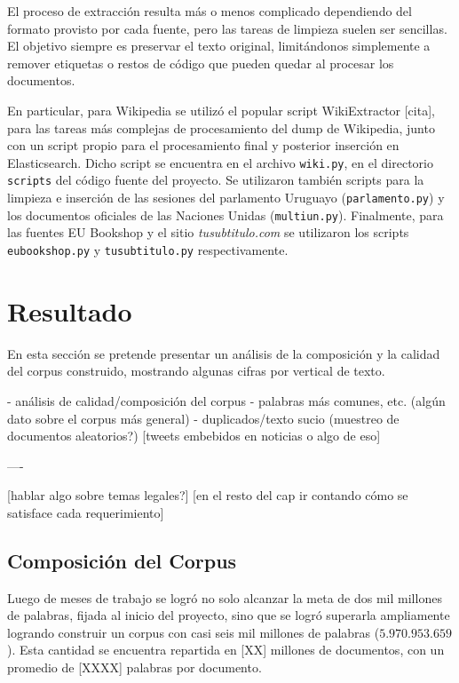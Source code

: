 El proceso de extracción resulta más o menos complicado dependiendo del formato provisto por cada
fuente, pero las tareas de limpieza suelen ser sencillas. El objetivo siempre es preservar el texto
original, limitándonos simplemente a remover etiquetas o restos de código que pueden quedar al
procesar los documentos.

En particular, para Wikipedia se utilizó el popular script WikiExtractor [cita], para las tareas más
complejas de procesamiento del dump de Wikipedia, junto con un script propio para el procesamiento
final y posterior inserción en Elasticsearch. Dicho script se encuentra en el archivo \texttt{wiki.py},
en el directorio \texttt{scripts} del código fuente del proyecto. Se utilizaron también scripts para la
limpieza e inserción de las sesiones del parlamento Uruguayo (\texttt{parlamento.py}) y los documentos
oficiales de las Naciones Unidas (\texttt{multiun.py}). Finalmente, para las fuentes EU Bookshop y el
sitio \textit{tusubtitulo.com} se utilizaron los scripts \texttt{eubookshop.py} y \texttt{tusubtitulo.py}
respectivamente.


\section{Resultado}

En esta sección se pretende presentar un análisis de la composición y la calidad del corpus
construido, mostrando algunas cifras por vertical de texto.

- análisis de calidad/composición del corpus
    - palabras más comunes, etc. (algún dato sobre el corpus más general)
    - duplicados/texto sucio (muestreo de documentos aleatorios?)
    [tweets embebidos en noticias o algo de eso]

----

[hablar algo sobre temas legales?]
[en el resto del cap ir contando cómo se satisface cada requerimiento]

\subsection{Composición del Corpus}

Luego de meses de trabajo se logró no solo alcanzar la meta de dos mil millones de palabras,
fijada al inicio del proyecto, sino que se logró superarla ampliamente logrando construir un
corpus con casi seis mil millones de palabras ($5.970.953.659$). Esta cantidad se encuentra
repartida en [XX] millones de documentos, con un promedio de [XXXX] palabras por
documento.


